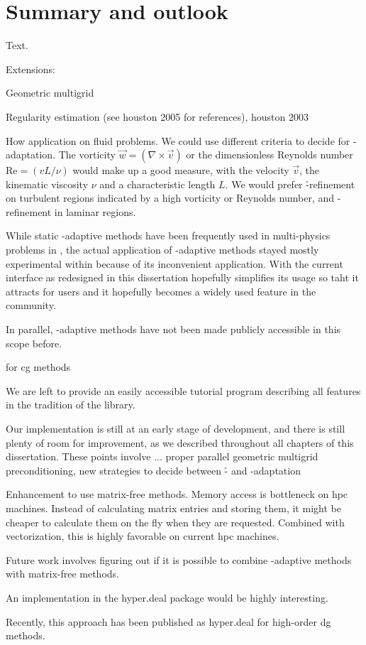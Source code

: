 \chapter{Summary and outlook}
\label{ch:summary}
Text.

Extensions:

Geometric multigrid

Regularity estimation (see houston 2005 for references), houston 2003


How application on fluid problems. We could use different criteria to decide for \hp-adaptation. The vorticity $\vec{w} = (\nabla \times \vec{v})$ or the dimensionless Reynolds number $\mathrm{Re} = (v L / \nu)$ would make up a good measure, with the velocity $\vec{v}$, the kinematic viscosity $\nu$ and a characteristic length $L$. We would prefer \h-refinement on turbulent regions indicated by a high vorticity or Reynolds number, and \p-refinement in laminar regions.


While static \hp-adaptive methods have been frequently used in multi-physics problems in \dealii{}, the actual application of \hp-adaptive methods stayed mostly experimental within \dealii{} because of its inconvenient application. With the current interface as redesigned in this dissertation hopefully simplifies its usage so taht it attracts for users and it hopefully becomes a widely used feature in the community.


In parallel, \hp-adaptive methods have not been made publicly accessible in this scope before.

for \gls{cg} methods

We are left to provide an easily accessible tutorial program describing all features in the tradition of the \dealii{} library.


Our implementation is still at an early stage of development, and there is still plenty of room for improvement, as we described throughout all chapters of this dissertation. These points involve ... proper parallel geometric multigrid preconditioning, new strategies to decide between \h- and \p-adaptation

Enhancement to use matrix-free methods. Memory access is bottleneck on hpc machines. Instead of calculating matrix entries and storing them, it might be cheaper to calculate them on the fly when they are requested. Combined with vectorization, this is highly favorable on current \gls{hpc} machines.


Future work involves figuring out if it is possible to combine \hp-adaptive methods with matrix-free methods.

An implementation in the hyper.deal \parencite{munch2020} package would be highly interesting.

Recently, this approach has been published as hyper.deal for high-order \gls{dg} methods.
